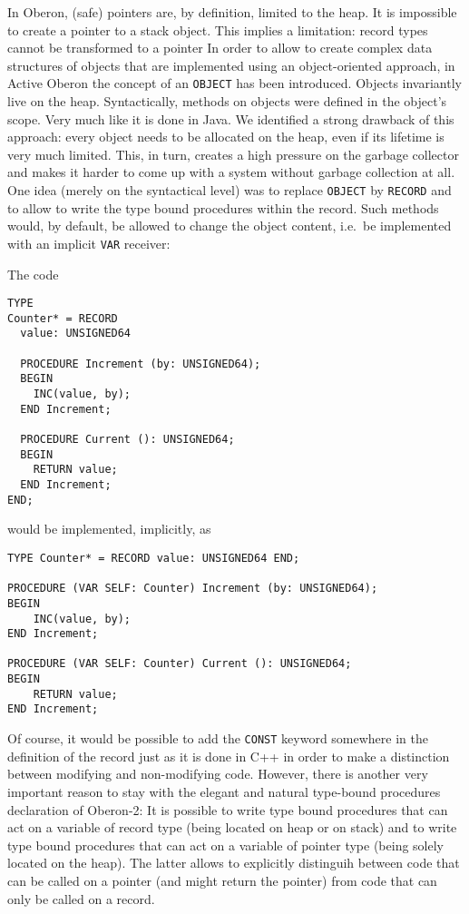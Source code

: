 \documentclass[a4wide,11pt]{article}
\begin{document}
\begin{annotation}
In Oberon, (safe) pointers are, by definition, limited to the heap.
It is impossible to create a pointer to a stack object.
This implies a limitation: record types cannot be transformed to a pointer
In order to allow to create complex data structures of objects that are implemented using an object-oriented approach, in Active Oberon the concept of an \lstinline"OBJECT" has been introduced. Objects invariantly live on the heap.
Syntactically, methods on objects were defined in the object's scope. Very much like it is done in Java.
We identified a strong drawback of this approach: every object needs to be allocated on the heap, even if its lifetime is very much limited.
This, in turn, creates a high pressure on the garbage collector and makes it harder to come up with a system without garbage collection at all.
One idea (merely on the syntactical level) was to replace \lstinline"OBJECT" by \lstinline"RECORD" and to allow to write the type bound procedures within the record.
Such methods would, by default, be allowed to change the object content, i.e.\ be implemented with an implicit \lstinline"VAR" receiver:

The code
\begin{lstlisting}[style=example]
TYPE
Counter* = RECORD
  value: UNSIGNED64

  PROCEDURE Increment (by: UNSIGNED64);
  BEGIN
    INC(value, by);
  END Increment;

  PROCEDURE Current (): UNSIGNED64;
  BEGIN
    RETURN value;
  END Increment;
END;
\end{lstlisting}
would be implemented, implicitly, as
\begin{lstlisting}[style=example]
TYPE Counter* = RECORD value: UNSIGNED64 END;

PROCEDURE (VAR SELF: Counter) Increment (by: UNSIGNED64);
BEGIN
	INC(value, by);
END Increment;

PROCEDURE (VAR SELF: Counter) Current (): UNSIGNED64;
BEGIN
	RETURN value;
END Increment;
\end{lstlisting}
Of course, it would be possible to add the \lstinline"CONST" keyword somewhere in the definition of the record just as it is done in C++ in order to make a distinction between modifying and non-modifying code.
However, there is another very important reason to stay with the elegant and natural type-bound procedures declaration of Oberon-2:
It is possible to write type bound procedures that can act on a variable of record type (being located on heap or on stack) and to write type bound procedures that can act on a variable of pointer type (being solely located on the heap).
The latter allows to explicitly distinguih between code that can be called on a pointer (and might return the pointer) from code that can only be called on a record.


\end{annotation}
\end{document}
